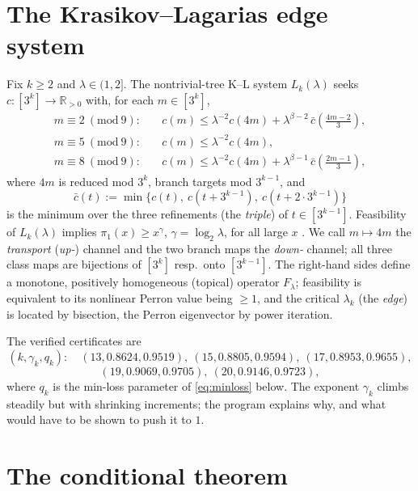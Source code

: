 \documentclass[11pt]{article}
\theoremstyle{definition}
\theoremstyle{remark}
\newcommand{\R}{\mathbb{R}}
\newcommand{\lam}{\lambda}
\newcommand{\gam}{\gamma}
\newcommand{\bet}{\beta}
\begin{document}
\section{The Krasikov--Lagarias edge system}
\label{sec:kl}

Fix $k \geq 2$ and $\lam \in (1, 2]$. The nontrivial-tree K--L system
$L_k(\lam)$ \cite{KL03} seeks $c : [3^k] \to \R_{>0}$ with, for each
$m \in [3^k]$,
\begin{align}
m \equiv 2 \ (\mathrm{mod}\ 9): &\quad
c(m) \leq \lam^{-2} c(4m) + \lam^{\bet-2}\, \bar c\!\left(\tfrac{4m-2}{3}\right),
\label{eq:L1}\\
m \equiv 5 \ (\mathrm{mod}\ 9): &\quad
c(m) \leq \lam^{-2} c(4m),
\label{eq:L2}\\
m \equiv 8 \ (\mathrm{mod}\ 9): &\quad
c(m) \leq \lam^{-2} c(4m) + \lam^{\bet-1}\, \bar c\!\left(\tfrac{2m-1}{3}\right),
\label{eq:L3}
\end{align}
where $4m$ is reduced mod $3^k$, branch targets mod $3^{k-1}$, and
\begin{equation}
\bar c(t) := \min\{ c(t),\ c(t + 3^{k-1}),\ c(t + 2 \cdot 3^{k-1})\}
\label{eq:min}
\end{equation}
is the minimum over the three refinements (the \emph{triple}) of $t \in
[3^{k-1}]$. Feasibility of $L_k(\lam)$ implies $\pi_1(x) \geq x^{\gam}$,
$\gam = \log_2 \lam$, for all large $x$ \cite{KL03}. We call $m \mapsto 4m$ the
\emph{transport} (\emph{up-}) channel and the two branch maps the \emph{down-}
channel; all three class maps are bijections of $[3^k]$ resp.\ onto
$[3^{k-1}]$. The right-hand sides define a monotone, positively homogeneous
(topical) operator $F_\lam$; feasibility is equivalent to its nonlinear Perron
value being $\geq 1$, and the critical $\lam_k$ (the \emph{edge}) is located by
bisection, the Perron eigenvector by power iteration.

The verified certificates \cite{Temp26} are
\[
(k, \gam_k, q_k) :\quad
(13, 0.8624, 0.9519),\ (15, 0.8805, 0.9594),\ (17, 0.8953, 0.9655),
\]
\[
(19, 0.9069, 0.9705),\ (20, 0.9146, 0.9723),
\]
where $q_k$ is the min-loss parameter of \eqref{eq:minloss} below. The exponent
$\gam_k$ climbs steadily but with shrinking increments; the program explains
why, and what would have to be shown to push it to $1$.

\section{The conditional theorem}
\label{sec:main}
\end{document}
